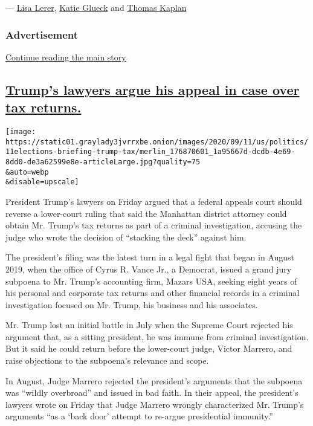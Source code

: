 --- \href{https://www.nytimes3xbfgragh.onion/by/lisa-lerer}{Lisa Lerer},
\href{https://www.nytimes3xbfgragh.onion/by/katie-glueck}{Katie Glueck}
and \href{https://www.nytimes3xbfgragh.onion/by/thomas-kaplan}{Thomas
Kaplan}

\hypertarget{advertisement}{%
\subsubsection{Advertisement}\label{advertisement}}

\protect\hyperlink{after-dfp-ad-mid1}{Continue reading the main story}

\hypertarget{trumps-lawyers-argue-his-appeal-in-case-over-tax-returns}{%
\subsection{\texorpdfstring{\protect\hyperlink{trumps-lawyers-argue-his-appeal-in-case-over-tax-returns}{Trump's
lawyers argue his appeal in case over tax
returns.}}{Trump's lawyers argue his appeal in case over tax returns.}}\label{trumps-lawyers-argue-his-appeal-in-case-over-tax-returns}}

\texttt{[image: https://static01.graylady3jvrrxbe.onion/images/2020/09/11/us/politics/11elections-briefing-trump-tax/merlin\_176870601\_1a95667d-dcdb-4e69-8dd0-de3a62599e8e-articleLarge.jpg?quality=75\\\&auto=webp\\\&disable=upscale]}

President Trump's lawyers on Friday argued that a federal appeals court
should reverse a lower-court ruling that said the Manhattan district
attorney could obtain Mr. Trump's tax returns as part of a criminal
investigation, accusing the judge who wrote the decision of ``stacking
the deck'' against him.

The president's filing was the latest turn in a legal fight that began
in August 2019, when the office of Cyrus R. Vance Jr., a Democrat,
issued a grand jury subpoena to Mr. Trump's accounting firm, Mazars USA,
seeking eight years of his personal and corporate tax returns and other
financial records in a criminal investigation focused on Mr. Trump, his
business and his associates.

Mr. Trump lost an initial battle in July when the Supreme Court rejected
his argument that, as a sitting president, he was immune from criminal
investigation. But it said he could return before the lower-court judge,
Victor Marrero, and raise objections to the subpoena's relevance and
scope.

In August, Judge Marrero rejected the president's arguments that the
subpoena was ``wildly overbroad'' and issued in bad faith. In their
appeal, the president's lawyers wrote on Friday that Judge Marrero
wrongly characterized Mr. Trump's arguments ``as a `back door' attempt
to re-argue presidential immunity.''

